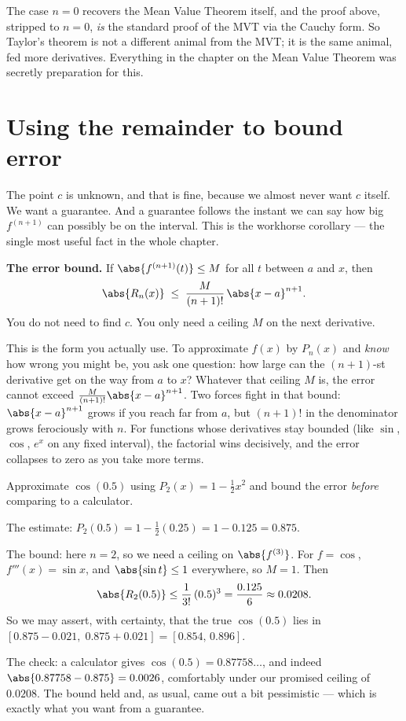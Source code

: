 \begin{remark}
The case $n=0$ recovers the Mean Value Theorem itself, and the proof above, stripped
to $n=0$, \emph{is} the standard proof of the MVT via the Cauchy form. So Taylor's
theorem is not a different animal from the MVT; it is the same animal, fed more
derivatives. Everything in the chapter on the Mean Value Theorem was secretly
preparation for this.
\end{remark}

\section{Using the remainder to bound error}

The point $c$ is unknown, and that is fine, because we almost never want $c$ itself.
We want a guarantee. And a guarantee follows the instant we can say how big
$f^{(n+1)}$ can possibly be on the interval. This is the workhorse corollary --- the
single most useful fact in the whole chapter.

\begin{focusbox}
\textbf{The error bound.} If $\abs{f^{(n+1)}(t)} \le M$ for all $t$ between $a$ and
$x$, then
\[
  \abs{R_n(x)} \;\le\; \frac{M}{(n+1)!}\,\abs{x-a}^{n+1}.
\]
You do not need to find $c$. You only need a ceiling $M$ on the next derivative.
\end{focusbox}

This is the form you actually use. To approximate $f(x)$ by $P_n(x)$ and \emph{know}
how wrong you might be, you ask one question: how large can the $(n+1)$-st derivative
get on the way from $a$ to $x$? Whatever that ceiling $M$ is, the error cannot exceed
$\frac{M}{(n+1)!}\abs{x-a}^{n+1}$. Two forces fight in that bound: $\abs{x-a}^{n+1}$
grows if you reach far from $a$, but $(n+1)!$ in the denominator grows ferociously
with $n$. For functions whose derivatives stay bounded (like $\sin$, $\cos$, $e^x$ on
any fixed interval), the factorial wins decisively, and the error collapses to zero as
you take more terms.

\begin{labbox}
Approximate $\cos(0.5)$ using $P_2(x) = 1 - \tfrac12 x^2$ and bound the error
\emph{before} comparing to a calculator.

The estimate: $P_2(0.5) = 1 - \tfrac12(0.25) = 1 - 0.125 = 0.875$.

The bound: here $n=2$, so we need a ceiling on $\abs{f^{(3)}}$. For $f=\cos$,
$f'''(x) = \sin x$, and $\abs{\sin t} \le 1$ everywhere, so $M=1$. Then
\[
  \abs{R_2(0.5)} \le \frac{1}{3!}\,(0.5)^3 = \frac{0.125}{6} \approx 0.0208.
\]
So we may assert, with certainty, that the true $\cos(0.5)$ lies in
$[0.875 - 0.021,\; 0.875 + 0.021] = [0.854,\, 0.896]$.

The check: a calculator gives $\cos(0.5) = 0.87758\ldots$, and indeed
$\abs{0.87758 - 0.875} = 0.0026$, comfortably under our promised ceiling of
$0.0208$. The bound held and, as usual, came out a bit pessimistic --- which is exactly
what you want from a guarantee.
\end{labbox}

